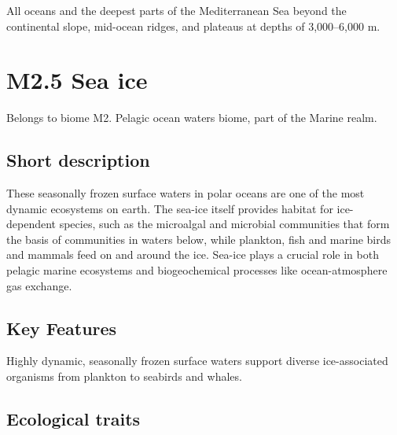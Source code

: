 \documentclass[
  letterpaper,
  DIV=11,
  numbers=noendperiod]{scrartcl}
\begin{document}
All oceans and the deepest parts of the Mediterranean Sea beyond the
continental slope, mid-ocean ridges, and plateaus at depths of
3,000--6,000 m.

\section{M2.5 Sea ice}\label{m2.5-sea-ice}

Belongs to biome M2. Pelagic ocean waters biome, part of the Marine
realm.

\subsection{Short description}\label{short-description-39}

These seasonally frozen surface waters in polar oceans are one of the
most dynamic ecosystems on earth. The sea-ice itself provides habitat
for ice-dependent species, such as the microalgal and microbial
communities that form the basis of communities in waters below, while
plankton, fish and marine birds and mammals feed on and around the ice.
Sea-ice plays a crucial role in both pelagic marine ecosystems and
biogeochemical processes like ocean-atmosphere gas exchange.

\subsection{Key Features}\label{key-features-39}

Highly dynamic, seasonally frozen surface waters support diverse
ice-associated organisms from plankton to seabirds and whales.

\subsection{Ecological traits}\label{ecological-traits-39}
\end{document}
